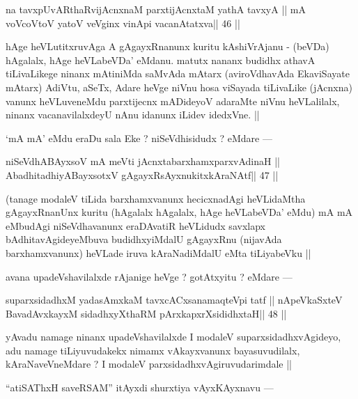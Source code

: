 \begin{shl}
na tavxpUvARthaRvijAcnxnaM parxtijAcnxtaM yathA tavxyA ||
mA voVcoV\s toV yatoV veVginx vinA\s pi vacanAtatxva\hfill || 46 ||
\end{shl}

\begin{artha}
hAge heVLutitxruvAga A gAgayxRnanunx kuritu kAshiVrAjanu - (beVDa) hAgalalx, hAge heVLabeVDa' eMdanu. matutx nananx budidhx athavA tiLivaLikege ninanx mAtiniMda saMvAda mAtarx (aviroVdhavAda EkaviSayate mAtarx) AdiVtu, aSeTx, Adare heVge niVnu hosa viSayada tiLivaLike (jAcnxna) vanunx heVLuveneMdu parxtijecnx mADideyoV adaraMte niVnu heVLalilalx, ninanx vacanavilalxdeyU nAnu idanunx iLidev idedxVne. ||
\end{artha}

\begin{artha}
`mA mA' eMdu eraDu sala Eke ? niSeVdhisidudx ? eMdare ---
\end{artha}

\begin{shl}
niSeVdhABAyxsoV mA meVti jAcnxtabarxhamxparxvAdinaH ||
AbadhitadhiyA\s BayxsotxV gAgayxRsAyxnukitxkAraNAtf\hfill || 47 ||
\end{shl}

\begin{artha}
(tanage modaleV  tiLida barxhamxvanunx hecicxnadAgi heVLidaMtha gAgayxRnanUnx kuritu (hAgalalx hAgalalx, hAge heVLabeVDa' eMdu) mA mA eMbudAgi niSeVdhavanunx eraDAvatiR heVLidudx savxlapx bAdhitavAgideyeMbuva budidhxyiMdalU gAgayxRnu (nijavAda barxhamxvanunx) heVLade iruva kAraNadiMdalU eMta tiLiyabeVku ||
\end{artha}

\begin{artha}
avana upadeVshavilalxde rAjanige heVge ? gotAtxyitu ? eMdare ---
\end{artha}

\begin{shl}
suparxsidadhxM yadasAmxkaM tavxcACxsanamaqteV\s pi tatf ||
nApeVkaSxteV BavadAvxkayxM sidadhxyXthaRM pArxkapxrXsididhxtaH\hfill || 48 ||
\end{shl}

\begin{artha}
yAvadu namage ninanx upadeVshavilalxde I modaleV suparxsidadhxvAgideyo, adu namage tiLiyuvudakekx nimamx vAkayxvanunx bayasuvudilalx, kAraNaveVneMdare ? I modaleV parxsidadhxvAgiruvudarimdale ||
\end{artha}

\begin{artha}
``atiSAThxH saveRSAM'' itAyxdi shurxtiya vAyxKAyxnavu ---
\end{artha}

